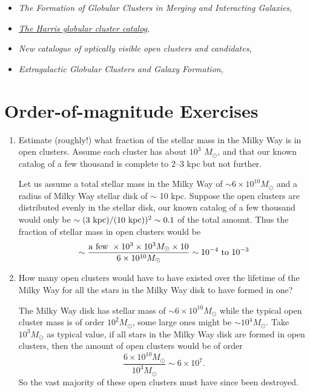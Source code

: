 \begin{itemize}
  \item
    {\it The Formation of Globular Clusters in Merging and Interacting
    Galaxies}, \citet{ashman92a}
  \item
    \href{http://physwww.mcmaster.ca/~harris/mwgc.dat}{\it The Harris globular cluster catalog}, \citet{harris96a}
  \item
    {\it New catalogue of optically visible open clusters and
    candidates}, \citet{dias02a}
  \item
    {\it Extragalactic Globular Clusters and Galaxy
    Formation}, \citet{brodie06a}
\end{itemize}

\section{Order-of-magnitude Exercises}

\begin{enumerate} 
\item Estimate (roughly!) what fraction of the stellar mass in
the Milky Way is in open clusters. Assume each cluster has about
    $10^3$ $M_\odot$, and that our known catalog of a few thousand is
    complete to $2$--$3$ kpc but not further.

\begin{answer}
Let us assume a total stellar mass in the Milky Way of $\sim 6 \times
10^{10} M_\odot$ and a radius of Milky Way stellar disk of $\sim$ 10
kpc. Suppose the open clusters are distributed evenly in the stellar
disk, our known catalog of a few thousand would only be $\sim (3 {\rm
~kpc}) / (10 {\rm ~kpc}))^2 \sim 0.1 $ of the total amount. Thus the
fraction of stellar mass in open clusters would be
\begin{equation}
\sim \frac{{\rm a~few~} \times 10^3 \times 10^3 M_\odot \times
10}{6 \times 10^{10} M_\odot} \sim 10^{-4} {\rm ~to~} 10^{-3}
\end{equation}
\end{answer}

\item How many open clusters would have to have existed over the
    lifetime of the Milky Way for all the stars in the Milky Way disk
to have formed in one?

\begin{answer}
The Milky Way disk has stellar mass of $\sim 6 \times 10^{10} M_\odot$
while the typical open cluster mass is of order $10^2 M_\odot$, some
large ones might be $\sim 10^4 M_\odot$. Take $10^3 M_\odot$ as
typical value, if all stars in the Milky Way disk are formed in open
clusters, then the amount of open clusters would be of order
\begin{equation}
\frac{6\times10^{10}M_\odot}{10^3 M_\odot}\sim 6\times 10^7.
\end{equation}
So the vast majority of these open clusters must have since been
destroyed.
\end{answer}

\end{enumerate} 

